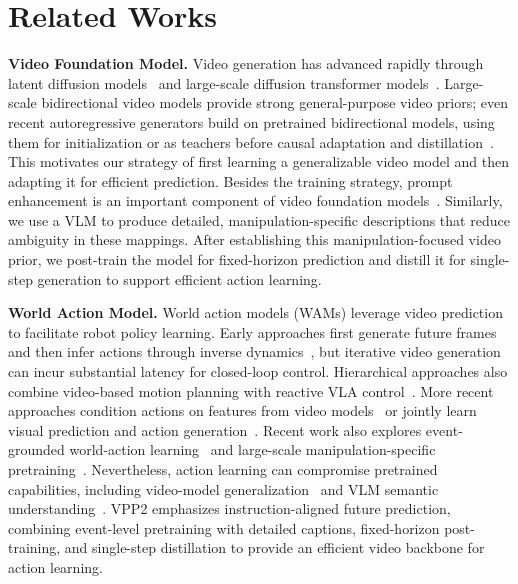 \section{Related Works}
\textbf{Video Foundation Model.}
Video generation has advanced rapidly through latent diffusion models~\citep{blattmann2023align,blattmann2023stable} and large-scale diffusion transformer models~\citep{yang2025cogvideox,wan2025wan,agarwal2025cosmos,agarwal2026cosmos}. Large-scale bidirectional video models provide strong general-purpose video priors; even recent autoregressive generators build on pretrained bidirectional models, using them for initialization or as teachers before causal adaptation and distillation~\citep{yin2025causvid,huang2025selfforcing}. This motivates our strategy of first learning a generalizable video model and then adapting it for efficient prediction. 
Besides the training strategy, prompt enhancement is an important component of video foundation models~\citep{yang2025cogvideox,wan2025wan}. Similarly, we use a VLM to produce detailed, manipulation-specific descriptions that reduce ambiguity in these mappings. After establishing this manipulation-focused video prior, we post-train the model for fixed-horizon prediction and distill it for single-step generation to support efficient action learning.

\textbf{World Action Model.}
World action models (WAMs) leverage video prediction to facilitate robot policy learning. Early approaches first generate future frames and then infer actions through inverse dynamics~\citep{du2024learning,black2023zero,bharadhwaj2024gen2act,liang2024dreamitate,feng2025vidar}, but iterative video generation can incur substantial latency for closed-loop control. Hierarchical approaches also combine video-based motion planning with reactive VLA control~\citep{zhang2026veoact}. More recent approaches condition actions on features from video models~\citep{hu2024video,liao2025genie,jia2025video2act,yan2026svam} or jointly learn visual prediction and action generation~\citep{zhang2025up,guo2024prediction,li2025unified,zhu2025unified,ma2026dit4dit,kim2026cosmospolicy,yan2026robustwam,ye2026dreamzero,li2026lingbotva,bi2026motus,motubrainteam2026motubrain}. Recent work also explores event-grounded world-action learning~\citep{li2026wallwm} and large-scale manipulation-specific pretraining~\citep{agibot2026geact2}. Nevertheless, action learning can compromise pretrained capabilities, including video-model generalization~\citep{mishra2026understanding} and VLM semantic understanding~\citep{zhang2026uam}. VPP2 emphasizes instruction-aligned future prediction, combining event-level pretraining with detailed captions, fixed-horizon post-training, and single-step distillation to provide an efficient video backbone for action learning.

